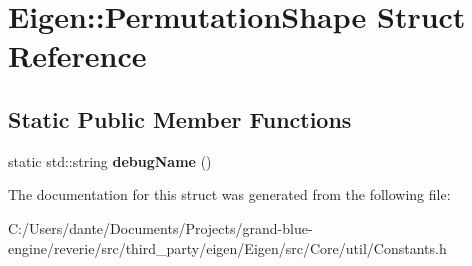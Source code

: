 \hypertarget{struct_eigen_1_1_permutation_shape}{}\section{Eigen\+::Permutation\+Shape Struct Reference}
\label{struct_eigen_1_1_permutation_shape}
\subsection*{Static Public Member Functions}
\begin{DoxyCompactItemize}
\item 
\mbox{\label{struct_eigen_1_1_permutation_shape_a5e7ccddac22d76e40150fe848522b5b1}} 
static std\+::string {\bfseries debug\+Name} ()
\end{DoxyCompactItemize}


The documentation for this struct was generated from the following file\+:\begin{DoxyCompactItemize}
\item 
C\+:/\+Users/dante/\+Documents/\+Projects/grand-\/blue-\/engine/reverie/src/third\+\_\+party/eigen/\+Eigen/src/\+Core/util/Constants.\+h\end{DoxyCompactItemize}
